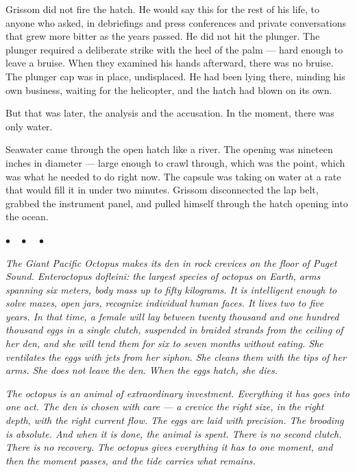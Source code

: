 \documentclass[12pt, letterpaper]{article}
\begin{document}
Grissom did not fire the hatch. He would say this for the rest of his life, to anyone who asked, in debriefings and press conferences and private conversations that grew more bitter as the years passed. He did not hit the plunger. The plunger required a deliberate strike with the heel of the palm --- hard enough to leave a bruise. When they examined his hands afterward, there was no bruise. The plunger cap was in place, undisplaced. He had been lying there, minding his own business, waiting for the helicopter, and the hatch had blown on its own.

But that was later, the analysis and the accusation. In the moment, there was only water.

Seawater came through the open hatch like a river. The opening was nineteen inches in diameter --- large enough to crawl through, which was the point, which was what he needed to do right now. The capsule was taking on water at a rate that would fill it in under two minutes. Grissom disconnected the lap belt, grabbed the instrument panel, and pulled himself through the hatch opening into the ocean.

\begin{center}
$\bullet\quad\bullet\quad\bullet$
\end{center}

\emph{The Giant Pacific Octopus makes its den in rock crevices on the floor of Puget Sound. Enteroctopus dofleini: the largest species of octopus on Earth, arms spanning six meters, body mass up to fifty kilograms. It is intelligent enough to solve mazes, open jars, recognize individual human faces. It lives two to five years. In that time, a female will lay between twenty thousand and one hundred thousand eggs in a single clutch, suspended in braided strands from the ceiling of her den, and she will tend them for six to seven months without eating. She ventilates the eggs with jets from her siphon. She cleans them with the tips of her arms. She does not leave the den. When the eggs hatch, she dies.}

\emph{The octopus is an animal of extraordinary investment. Everything it has goes into one act. The den is chosen with care --- a crevice the right size, in the right depth, with the right current flow. The eggs are laid with precision. The brooding is absolute. And when it is done, the animal is spent. There is no second clutch. There is no recovery. The octopus gives everything it has to one moment, and then the moment passes, and the tide carries what remains.}
\end{document}
